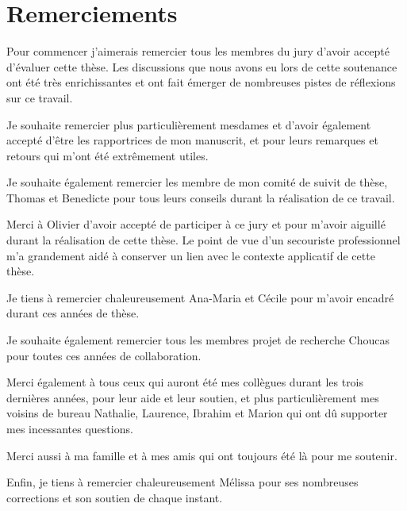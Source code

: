 \section*{Remerciements}

Pour commencer j'aimerais remercier tous les membres du jury d'avoir
accepté d'évaluer cette thèse. Les discussions que nous avons eu lors
de cette soutenance ont été très enrichissantes et ont fait émerger de
nombreuses pistes de réflexions sur ce travail.

Je souhaite remercier plus particulièrement mesdames
 et  d'avoir également accepté
d'être les rapportrices de mon manuscrit, et pour leurs remarques et
retours qui m'ont été extrêmement utiles.

Je souhaite également remercier les membre de mon comité de suivit de
thèse, Thomas  et Benedicte  pour tous
leurs conseils durant la réalisation de ce travail.

Merci à Olivier  d'avoir accepté de participer à ce jury et
pour m'avoir aiguillé durant la réalisation de cette thèse. Le point
de vue d'un secouriste professionnel m'a grandement aidé à conserver
un lien avec le contexte applicatif de cette thèse.

Je tiens à remercier chaleureusement Ana-Maria et Cécile pour m'avoir
encadré durant ces années de thèse.

Je souhaite également remercier tous les membres projet de recherche
Choucas pour toutes ces années de collaboration.

Merci également à tous ceux qui auront été mes collègues durant les
trois dernières années, pour leur aide et leur soutien, et plus
particulièrement mes voisins de bureau Nathalie, Laurence, Ibrahim et
Marion qui ont dû supporter mes incessantes questions.

Merci aussi à ma famille et à mes amis qui ont toujours été là pour me
soutenir.

Enfin, je tiens à remercier chaleureusement Mélissa pour ses
nombreuses corrections et son soutien de chaque instant.